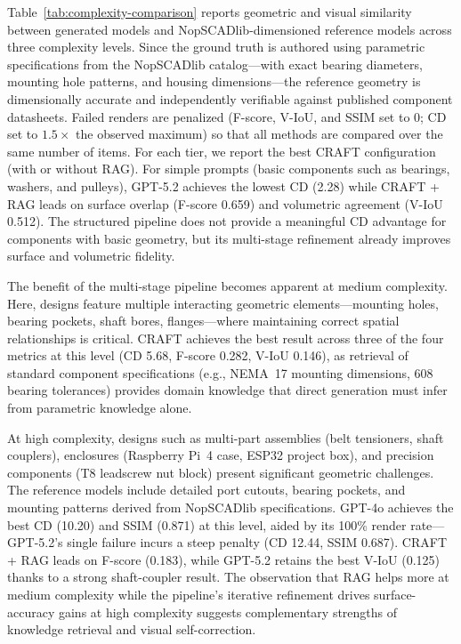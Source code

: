 \documentclass[5p,twocolumn,10pt,times]{elsarticle}
\begin{document}
Table~\ref{tab:complexity-comparison} reports geometric and visual similarity between generated models and NopSCADlib-dimensioned reference models across three complexity levels. Since the ground truth is authored using parametric specifications from the NopSCADlib catalog---with exact bearing diameters, mounting hole patterns, and housing dimensions---the reference geometry is dimensionally accurate and independently verifiable against published component datasheets. Failed renders are penalized (F-score, V-IoU, and SSIM set to 0; CD set to $1.5\times$ the observed maximum) so that all methods are compared over the same number of items. For each tier, we report the best CRAFT configuration (with or without RAG). For simple prompts (basic components such as bearings, washers, and pulleys), GPT-5.2 achieves the lowest CD (2.28) while CRAFT + RAG leads on surface overlap (F-score 0.659) and volumetric agreement (V-IoU 0.512). The structured pipeline does not provide a meaningful CD advantage for components with basic geometry, but its multi-stage refinement already improves surface and volumetric fidelity.

The benefit of the multi-stage pipeline becomes apparent at medium complexity. Here, designs feature multiple interacting geometric elements---mounting holes, bearing pockets, shaft bores, flanges---where maintaining correct spatial relationships is critical. CRAFT achieves the best result across three of the four metrics at this level (CD 5.68, F-score 0.282, V-IoU 0.146), as retrieval of standard component specifications (e.g., NEMA~17 mounting dimensions, 608 bearing tolerances) provides domain knowledge that direct generation must infer from parametric knowledge alone.

At high complexity, designs such as multi-part assemblies (belt tensioners, shaft couplers), enclosures (Raspberry Pi~4 case, ESP32 project box), and precision components (T8 leadscrew nut block) present significant geometric challenges. The reference models include detailed port cutouts, bearing pockets, and mounting patterns derived from NopSCADlib specifications. GPT-4o achieves the best CD (10.20) and SSIM (0.871) at this level, aided by its 100\% render rate---GPT-5.2's single failure incurs a steep penalty (CD 12.44, SSIM 0.687). CRAFT + RAG leads on F-score (0.183), while GPT-5.2 retains the best V-IoU (0.125) thanks to a strong shaft-coupler result. The observation that RAG helps more at medium complexity while the pipeline's iterative refinement drives surface-accuracy gains at high complexity suggests complementary strengths of knowledge retrieval and visual self-correction.
\end{document}
